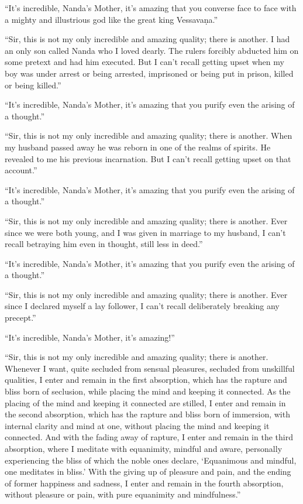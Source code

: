 \documentclass[12pt,openany]{book}%
\begin{document}
“It’s incredible, Nanda’s Mother, it’s amazing that you converse face to face with a mighty and illustrious god like the great king \textsanskrit{Vessavaṇa}.” 

“Sir, this is not my only incredible and amazing quality; there is another. I had an only son called Nanda who I loved dearly. The rulers forcibly abducted him on some pretext and had him executed. But I can’t recall getting upset when my boy was under arrest or being arrested, imprisoned or being put in prison, killed or being killed.” 

“It’s incredible, Nanda’s Mother, it’s amazing that you purify even the arising of a thought.” 

“Sir, this is not my only incredible and amazing quality; there is another. When my husband passed away he was reborn in one of the realms of spirits. He revealed to me his previous incarnation. But I can’t recall getting upset on that account.” 

“It’s incredible, Nanda’s Mother, it’s amazing that you purify even the arising of a thought.” 

“Sir, this is not my only incredible and amazing quality; there is another. Ever since we were both young, and I was given in marriage to my husband, I can’t recall betraying him even in thought, still less in deed.” 

“It’s incredible, Nanda’s Mother, it’s amazing that you purify even the arising of a thought.” 

“Sir, this is not my only incredible and amazing quality; there is another. Ever since I declared myself a lay follower, I can’t recall deliberately breaking any precept.” 

“It’s incredible, Nanda’s Mother, it’s amazing!” 

“Sir, this is not my only incredible and amazing quality; there is another. Whenever I want, quite secluded from sensual pleasures, secluded from unskillful qualities, I enter and remain in the first absorption, which has the rapture and bliss born of seclusion, while placing the mind and keeping it connected. As the placing of the mind and keeping it connected are stilled, I enter and remain in the second absorption, which has the rapture and bliss born of immersion, with internal clarity and mind at one, without placing the mind and keeping it connected. And with the fading away of rapture, I enter and remain in the third absorption, where I meditate with equanimity, mindful and aware, personally experiencing the bliss of which the noble ones declare, ‘Equanimous and mindful, one meditates in bliss.’ With the giving up of pleasure and pain, and the ending of former happiness and sadness, I enter and remain in the fourth absorption, without pleasure or pain, with pure equanimity and mindfulness.” 
\end{document}
